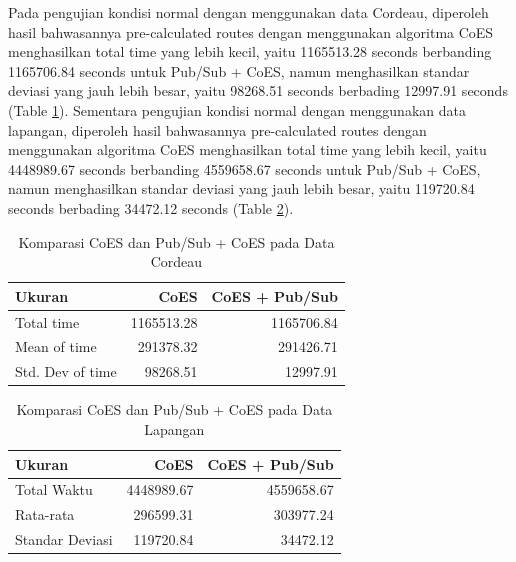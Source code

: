 \documentclass[conference]{IEEEtran}
\newcommand{\ra}[1]{\renewcommand{\arraystretch}{#1}}
\begin{document}
Pada pengujian kondisi normal dengan menggunakan data Cordeau, diperoleh hasil bahwasannya pre-calculated routes dengan menggunakan algoritma CoES menghasilkan total time yang lebih kecil, yaitu 1165513.28 seconds berbanding 1165706.84 seconds untuk Pub/Sub + CoES, namun menghasilkan standar deviasi yang jauh lebih besar, yaitu 98268.51 seconds berbading 12997.91 seconds (Table \ref{tbl:test_result_normal_cordeau_comparison}). Sementara pengujian kondisi normal dengan menggunakan data lapangan, diperoleh hasil bahwasannya pre-calculated routes dengan menggunakan algoritma CoES menghasilkan total time yang lebih kecil, yaitu 4448989.67 seconds berbanding 4559658.67 seconds untuk Pub/Sub + CoES, namun menghasilkan standar deviasi yang jauh lebih besar, yaitu 119720.84 seconds berbading 34472.12 seconds (Table \ref{tbl:test_result_normal_field_comparison}).


\begin{table}
	\centering
	\ra{1.3}
	\caption{Komparasi CoES dan Pub/Sub + CoES pada Data Cordeau}
	\label{tbl:test_result_normal_cordeau_comparison}
	\begin{tabular}{lrr}
		\toprule
			Ukuran & CoES & CoES + Pub/Sub\\ 
		\midrule
			Total time & 1165513.28 & 1165706.84\\
			Mean of time & 291378.32 & 291426.71\\
			Std. Dev of time & 98268.51 & 12997.91\\
		\bottomrule
	\end{tabular}
\end{table}


\begin{table}
	\centering
	\ra{1.3}
	\caption{Komparasi CoES dan Pub/Sub + CoES pada Data Lapangan}
	\label{tbl:test_result_normal_field_comparison}
	\begin{tabular}{lrr}
		\toprule
			Ukuran & CoES & CoES + Pub/Sub\\ 
		\midrule
			Total Waktu & 4448989.67 & 4559658.67\\
			Rata-rata & 296599.31 & 303977.24\\
			Standar Deviasi & 119720.84 & 34472.12\\
		\bottomrule
	\end{tabular}
\end{table}


\end{document}

